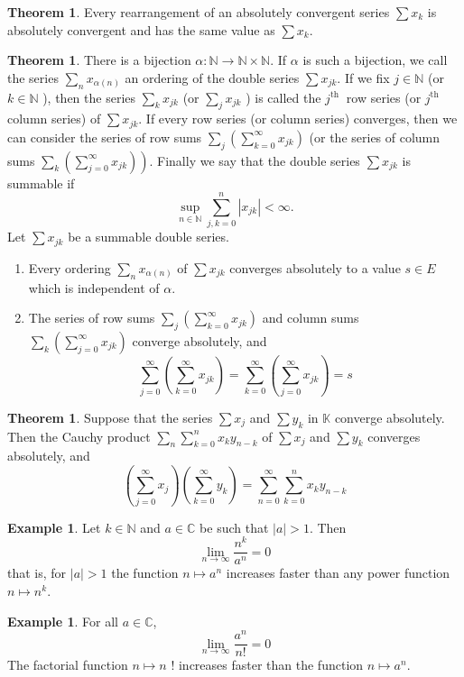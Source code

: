 \documentclass[12pt,a4paper]{book}
\newenvironment{enu}{\begin{enumerate}[(1)]}{\end{enumerate}}
\theoremstyle{definition}
\newtheorem{theo}[defn]{Theorem}
\newtheorem{exam}[defn]{Example}
\begin{document}
\begin{theo}
    Every rearrangement of an absolutely convergent series $\sum x_k$ is absolutely convergent and has the same value as $\sum x_k$.
\end{theo}
\begin{theo}
    There is a bijection $\alpha: \mathbb{N} \rightarrow \mathbb{N} \times \mathbb{N}$. If $\alpha$ is such a bijection, we call the series $\sum_n x_{\alpha(n)}$ an ordering of the double series $\sum x_{j k}$. If we fix $j \in \mathbb{N}$ (or $k \in \mathbb{N}$ ), then the series $\sum_k x_{j k}$ (or $\sum_j x_{j k}$ ) is called the $j^{\text {th }}$ row series (or $j^{\text {th }}$ column series) of $\sum x_{j k}$. If every row series (or column series) converges, then we can consider the series of row sums $\sum_j\left(\sum_{k=0}^{\infty} x_{j k}\right)$ (or the series of column sums $\left.\sum_k\left(\sum_{j=0}^{\infty} x_{j k}\right)\right)$. Finally we say that the double series $\sum x_{j k}$ is summable if
    $$
        \sup _{n \in \mathbb{N}} \sum_{j, k=0}^n\left|x_{j k}\right|<\infty .
    $$
    Let $\sum x_{j k}$ be a summable double series.
    \begin{enu}
        \item  Every ordering $\sum_n x_{\alpha(n)}$ of $\sum x_{j k}$ converges absolutely to a value $s \in E$ which is independent of $\alpha$.
        \item The series of row sums $\sum_j\left(\sum_{k=0}^{\infty} x_{j k}\right)$ and column sums $\sum_k\left(\sum_{j=0}^{\infty} x_{j k}\right)$ converge absolutely, and
        $$
            \sum_{j=0}^{\infty}\left(\sum_{k=0}^{\infty} x_{j k}\right)=\sum_{k=0}^{\infty}\left(\sum_{j=0}^{\infty} x_{j k}\right)=s
        $$
    \end{enu}
\end{theo}
\begin{theo}
    Suppose that the series $\sum x_j$ and $\sum y_k$ in $\mathbb{K}$ converge absolutely. Then the Cauchy product $\sum_n \sum_{k=0}^n x_k y_{n-k}$ of $\sum x_j$ and $\sum y_k$ converges absolutely, and
    $$
        \left(\sum_{j=0}^{\infty} x_j\right)\left(\sum_{k=0}^{\infty} y_k\right)=\sum_{n=0}^{\infty} \sum_{k=0}^n x_k y_{n-k}
    $$
\end{theo}
\begin{exam}
    Let $k \in \mathbb{N}$ and $a \in \mathbb{C}$ be such that $|a|>1$. Then
    $$
    \lim _{n \rightarrow \infty} \frac{n^k}{a^n}=0
    $$
    that is, for $|a|>1$ the function $n \mapsto a^n$ increases faster than any power function $n \mapsto n^k$.
\end{exam}
\begin{exam}
    For all $a \in \mathbb{C}$,
    $$
    \lim _{n \rightarrow \infty} \frac{a^n}{n!}=0
    $$
    The factorial function $n \mapsto n$ ! increases faster than the function $n \mapsto a^n$.
\end{exam}
\end{document}
